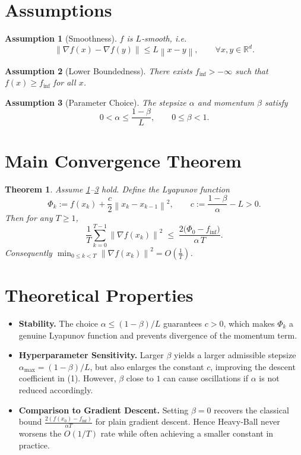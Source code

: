 \documentclass{article}
\newtheorem{theorem}{Theorem}
\newtheorem{assumption}{Assumption}
\newcommand{\norm}[1]{\left\lVert#1\right\rVert}
\begin{document}
\newpage
\section*{Assumptions}
\begin{assumption}[Smoothness]\label{as:smooth}
$f$ is $L$‑smooth, i.e.
\[
    \norm{\nabla f(x)-\nabla f(y)}\le L\norm{x-y},\qquad\forall x,y\in\mathbb{R}^{d}.
\]
\end{assumption}
\begin{assumption}[Lower Boundedness]\label{as:lb}
There exists $f_{\inf}>-\infty$ such that $f(x)\ge f_{\inf}$ for all $x$.
\end{assumption}
\begin{assumption}[Parameter Choice]\label{as:param}
The stepsize $\alpha$ and momentum $\beta$ satisfy
\[
0<\alpha\le\frac{1-\beta}{L},\qquad 0\le\beta<1.
\]
\end{assumption}

\section*{Main Convergence Theorem}
\begin{theorem}\label{thm:main}
Assume \ref{as:smooth}–\ref{as:param} hold. Define the Lyapunov function
\[
\Phi_{k}:=f(x_{k})+\frac{c}{2}\norm{x_{k}-x_{k-1}}^{2},
\qquad 
c:=\frac{1-\beta}{\alpha}-L>0.
\]
Then for any $T\ge1$,
\[
\frac{1}{T}\sum_{k=0}^{T-1}\norm{\nabla f(x_{k})}^{2}
\;\le\;
\frac{2\bigl(\Phi_{0}-f_{\inf}\bigr)}{\alpha\,T}.
\tag{1}
\]
Consequently $\displaystyle\min_{0\le k<T}\norm{\nabla f(x_{k})}^{2}=O\!\left(\frac{1}{T}\right)$.
\end{theorem}

\section*{Theoretical Properties}
\begin{itemize}
\item \textbf{Stability.} The choice $\alpha\le(1-\beta)/L$ guarantees $c>0$, which makes $\Phi_{k}$ a genuine Lyapunov function and prevents divergence of the momentum term.
\item \textbf{Hyperparameter Sensitivity.} Larger $\beta$ yields a larger admissible stepsize $\alpha_{\max}=(1-\beta)/L$, but also enlarges the constant $c$, improving the descent coefficient in (1). However, $\beta$ close to $1$ can cause oscillations if $\alpha$ is not reduced accordingly.
\item \textbf{Comparison to Gradient Descent.} Setting $\beta=0$ recovers the classical bound $\frac{2(f(x_{0})-f_{\inf})}{\alpha T}$ for plain gradient descent. Hence Heavy‑Ball never worsens the $O(1/T)$ rate while often achieving a smaller constant in practice.
\end{itemize}
\end{document}
